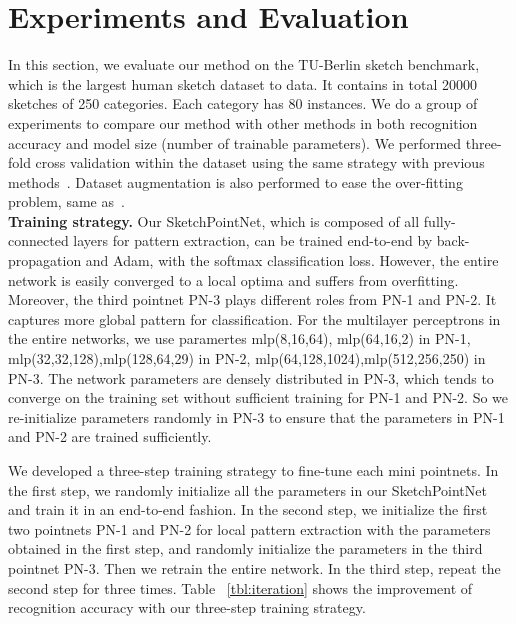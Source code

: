 \section{Experiments and Evaluation}
\label{sec:experiments}

In this section, we evaluate our method on the TU-Berlin sketch benchmark, which is the largest human sketch dataset to data.
%
It contains in total 20000 sketches of 250 categories. Each category has 80 instances.
%
We do a group of experiments to compare our method with other methods in both recognition accuracy and model size (number of trainable parameters).
%
We performed three-fold cross validation within the dataset using
the same strategy with previous methods~\cite{Yu2015SketchaNetTB, Dupont2016DeepSketch2D}.
Dataset augmentation is also performed to ease the over-fitting problem, same as~\cite{Yu2015SketchaNetTB}.
\\


\noindent \textbf{Training strategy.}
%
Our SketchPointNet, which is composed of all fully-connected layers for pattern extraction, can be trained end-to-end by back-propagation and Adam, with the softmax classification loss.
%
However, the entire network is easily converged to a local optima and suffers from overfitting.
Moreover, the third pointnet PN-3 plays different roles from PN-1 and PN-2. It captures more global pattern for classification.
%
For the multilayer perceptrons in the entire networks, we use paramertes mlp(8,16,64), mlp(64,16,2) in PN-1, mlp(32,32,128),mlp(128,64,29) in PN-2, mlp(64,128,1024),mlp(512,256,250) in PN-3.
%
The network parameters are densely distributed in PN-3, which tends to converge on the training set without sufficient training for PN-1 and PN-2.
So we re-initialize parameters randomly in PN-3 to ensure that the parameters in PN-1 and PN-2 are trained sufficiently.

We developed a three-step training strategy to fine-tune each mini pointnets.
%
In the first step, we randomly initialize all the parameters in our SketchPointNet and  train it in an end-to-end fashion.
%
In the second step, we initialize the first two pointnets PN-1 and PN-2 for local pattern extraction with the parameters obtained in the first step, and randomly initialize the parameters in the third pointnet PN-3. Then we retrain the entire network.
%
In the third step, repeat the second step for three times.
%
Table ~\ref{tbl:iteration} shows the improvement of recognition accuracy with our three-step training strategy.


